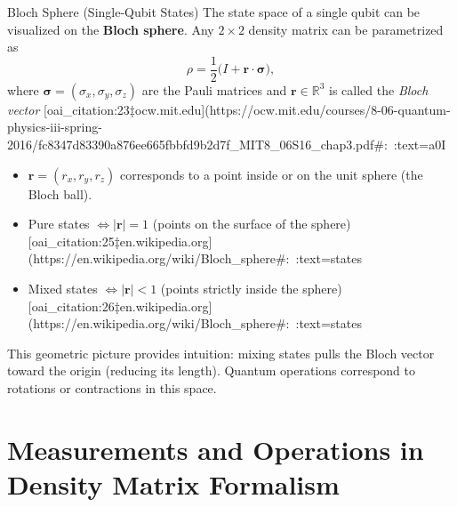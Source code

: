 \begin{frame}{Bloch Sphere (Single-Qubit States)}
 The state space of a single qubit can be visualized on the \textbf{Bloch sphere}. Any $2\times2$ density matrix can be parametrized as 
\[
  \rho = \frac{1}{2}\Big(I + \mathbf{r}\cdot \boldsymbol{\sigma}\Big),
\] 
where $\boldsymbol{\sigma}=(\sigma_x,\sigma_y,\sigma_z)$ are the Pauli matrices and $\mathbf{r}\in\mathbb{R}^3$ is called the \emph{Bloch vector} [oai_citation:23‡ocw.mit.edu](https://ocw.mit.edu/courses/8-06-quantum-physics-iii-spring-2016/fc8347d83390a876ee665fbbfd9b2d7f_MIT8_06S16_chap3.pdf#:~:text=a0I%
  \begin{itemize}
    \item $\mathbf{r} = (r_x, r_y, r_z)$ corresponds to a point inside or on the unit sphere (the Bloch ball).
    \item Pure states $\Leftrightarrow |\mathbf{r}| = 1$ (points on the surface of the sphere) [oai_citation:25‡en.wikipedia.org](https://en.wikipedia.org/wiki/Bloch_sphere#:~:text=states%
    \item Mixed states $\Leftrightarrow |\mathbf{r}| < 1$ (points strictly inside the sphere) [oai_citation:26‡en.wikipedia.org](https://en.wikipedia.org/wiki/Bloch_sphere#:~:text=states%
  \end{itemize}
  This geometric picture provides intuition: mixing states pulls the Bloch vector toward the origin (reducing its length). Quantum operations correspond to rotations or contractions in this space.
\end{frame}

\section{Measurements and Operations in Density Matrix Formalism}

